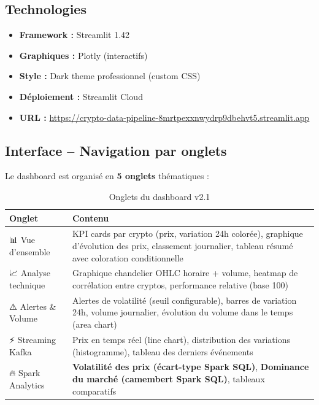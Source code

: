\documentclass[12pt,a4paper]{article}
\begin{document}
\subsection{Technologies}
\begin{itemize}
    \item \textbf{Framework :} Streamlit 1.42
    \item \textbf{Graphiques :} Plotly (interactifs)
    \item \textbf{Style :} Dark theme professionnel (custom CSS)
    \item \textbf{Déploiement :} Streamlit Cloud
    \item \textbf{URL :} \url{https://crypto-data-pipeline-8mrtpexxnwydrp9dbehvt5.streamlit.app}
\end{itemize}

\subsection{Interface -- Navigation par onglets}

Le dashboard est organisé en \textbf{5 onglets} thématiques :

\begin{table}[H]
\centering
\begin{tabular}{|l|p{9cm}|}
\hline
\textbf{Onglet} & \textbf{Contenu} \\
\hline
📊 Vue d'ensemble &
KPI cards par crypto (prix, variation 24h colorée),
graphique d'évolution des prix, classement journalier,
tableau résumé avec coloration conditionnelle \\
\hline
📈 Analyse technique &
Graphique chandelier OHLC horaire + volume,
heatmap de corrélation entre cryptos,
performance relative (base 100) \\
\hline
⚠️ Alertes \& Volume &
Alertes de volatilité (seuil configurable),
barres de variation 24h, volume journalier,
évolution du volume dans le temps (area chart) \\
\hline
⚡ Streaming Kafka &
Prix en temps réel (line chart),
distribution des variations (histogramme),
tableau des derniers événements \\
\hline
\rowcolor{orange!15}
🔥 Spark Analytics &
\textbf{Volatilité des prix (écart-type Spark SQL)},
\textbf{Dominance du marché (camembert Spark SQL)},
tableaux comparatifs \\
\hline
\end{tabular}
\caption{Onglets du dashboard v2.1}
\end{table}
\end{document}
